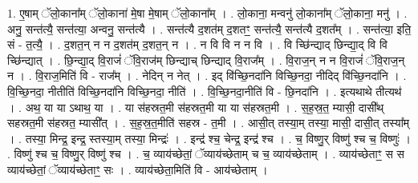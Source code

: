 \documentclass[17pt]{extarticle}
\begin{document}
1. ए॒षाम् ॅलो॒काना᳚म् ॅलो॒काना॑ मे॒षा मे॒षाम् ॅलो॒काना᳚म् । . लो॒काना॒ मन्वनु॑ लो॒काना᳚म् ॅलो॒काना॒ मनु॑ । . अनु॒ सन्त॑त्यै॒ सन्त॑त्या॒ अन्वनु॒ सन्त॑त्यै । . सन्त॑त्यै द॒शत॑म् द॒शतꣳ॒॒ सन्त॑त्यै॒ सन्त॑त्यै द॒शत᳚म् । . सन्त॑त्या॒ इति॒ सं - त॒त्यै॒ । . द॒शत॒न् न न द॒शत॑म् द॒शत॒न् न । . न वि वि न न वि । . वि च्छि॑न्द्याद् छिन्द्या॒द् वि वि च्छि॑न्द्यात् । . छि॒न्द्या॒द् वि॒राजं॑ ॅवि॒राज॑म् छिन्द्याच् छिन्द्याद् वि॒राज᳚म् । . वि॒राज॒न् न न वि॒राजं॑ ॅवि॒राज॒न् न । . वि॒राज॒मिति॑ वि - राज᳚म् । . नेदिन् न नेत् । . इद् वि॑च्छि॒नदा॑नि विच्छि॒नदा॒ नीदिद् वि॑च्छि॒नदा॑नि । . वि॒च्छि॒नदा॒ नीतीति॑ विच्छि॒नदा॑नि विच्छि॒नदा॒ नीति॑ । . वि॒च्छि॒नदा॒नीति॑ वि - छि॒नदा॑नि । . इत्यथाथे तीत्यथ॑ । . अथ॒ या या ऽथाथ॒ या । . या स॑हस्रत॒मी स॑हस्रत॒मी या या स॑हस्रत॒मी । . स॒ह॒स्र॒त॒ म्यासी॒ दासी᳚थ् सहस्रत॒मी स॑हस्रत॒ म्यासी᳚त् । . स॒ह॒स्र॒त॒मीति॑ सहस्र - त॒मी । . आसी॒त् तस्या॒म् तस्या॒ मासी॒ दासी॒त् तस्या᳚म् । . तस्या॒ मिन्द्र॒ इन्द्र॒ स्तस्या॒म् तस्या॒ मिन्द्रः॑ । . इन्द्र॑ श्च॒ चेन्द्र॒ इन्द्र॑ श्च । . च॒ विष्णु॒र् विष्णु॑ श्च च॒ विष्णुः॑ । . विष्णु॑ श्च च॒ विष्णु॒र् विष्णु॑ श्च । . च॒ व्याय॑च्छेतां॒ ॅव्याय॑च्छेताम् च च॒ व्याय॑च्छेताम् । . व्याय॑च्छेताꣳ॒॒ स स व्याय॑च्छेतां॒ ॅव्याय॑च्छेताꣳ॒॒ सः । . व्याय॑च्छेता॒मिति॑ वि - आय॑च्छेताम् । \newline
\end{document}
